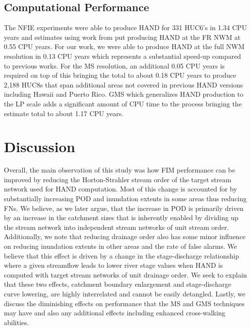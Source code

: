 \documentclass[draft]{dependencies/agujournal2019}
\begin{document}
\subsection{Computational Performance}
\label{ssec:compuational_performance}
%
The NFIE experiments were able to produce HAND for 331 HUC6's in 1.34 CPU years \cite{liu2016cybergis} and estimates using work from  put producing HAND at the FR NWM at 0.55 CPU years. 
For our work, we were able to produce HAND at the full NWM resolution in 0.13 CPU years which represents a substantial speed-up compared to previous works.
For the MS resolution, an additional 0.05 CPU years is required on top of this bringing the total to about 0.18 CPU years to produce 2,188 HUC8s that span additional areas not covered in previous HAND versions including Hawaii and Puerto Rico.
GMS which generalizes HAND production to the LP scale adds a significant amount of CPU time to the process bringing the estimate total to about 1.17 CPU years.
%
\clearpage %
\section{Discussion}
\label{sec:discussion}
%
Overall, the main observation of this study was how FIM performance can be improved by reducing the Horton-Strahler stream order of the target stream network used for HAND computation.
Most of this change is accounted for by substantially increasing POD and inundation extents in some areas thus reducing FNs.
We believe, as we later argue, that the increase in POD is primarily driven by an increase in the catchment sizes that is inherently enabled by dividing up the stream network into independent stream networks of unit stream order.
Additionally, we note that reducing drainage order also has some minor influence on reducing inundation extents in other areas and the rate of false alarms.
We believe that this effect is driven by a change in the stage-discharge relationship where a given streamflow leads to lower river stage values when HAND is computed with target stream networks of unit drainage order.
We seek to explain that these two effects, catchment boundary enlargement and stage-discharge curve lowering, are highly interrelated and cannot be easily detangled.
Lastly, we discuss the diminishing effects on performance that the MS and GMS techniques may have and also any additional effects including enhanced cross-walking abilities.
\end{document}
